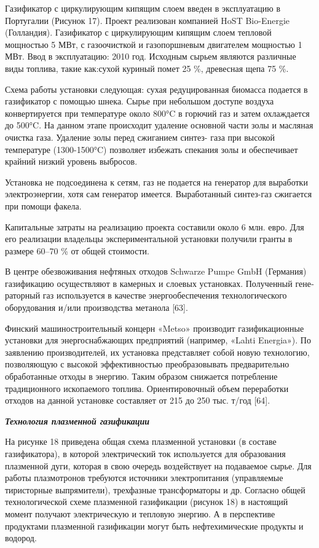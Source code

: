 \begin{multicols}{2}
Газификатор с циркулирующим кипящим слоем введен в эксплуатацию в
Португалии (Рисунок 17). Проект реализован компанией HoST Bio-Energie
(Голландия). Газификатор с циркулирующим кипящим слоем тепловой
мощностью 5 МВт, с газоочисткой и газопоршневым двигателем мощностью 1
МВт. Ввод в эксплуатацию: 2010 год. Исходным сырьем являются различные
виды топлива, такие как:сухой куриный помет 25 \%, древесная щепа 75 \%.

Схема работы установки следующая: сухая редуцированная биомасса подается
в газификатор с помощью шнека. Сырье при небольшом доступе воздуха
конвертируется при температуре около 800°C в горючий газ и затем
охлаждается до 500°C. На данном этапе происходит удаление основной части
золы и масляная очистка газа. Удаление золы перед сжиганием синтез- газа
при высокой температуре (1300-1500°C) позволяет избежать спекания золы и
обеспечивает крайний низкий уровень выбросов.

Установка не подсоединена к сетям, газ не подается на генератор для
выработки электроэнергии, хотя сам генератор имеется. Выработанный
синтез-газ сжигается при помощи факела.

Капитальные затраты на реализацию проекта составили около 6 млн. евро.
Для его реализации владельцы экспериментальной установки получили гранты
в размере 60--70 \% от общей стоимости.

В центре обезвоживания нефтяных отходов Schwarze Pumpe GmbH (Германия)
газификацию осуществляют в камерных и слоевых установках. Полученный
гене­раторный газ используется в качестве энергообеспече­ния
технологического оборудования и/или производства метанола {[}63{]}.

Финский машиностроительный концерн «Metso» про­изводит газификационные
установки для энергоснаб­жающих предприятий (например, «Lahti Energia»).
По заявлению производителей, их установка представля­ет собой новую
технологию, позволяющую с высокой эффективностью преобразовывать
предварительно обработанные отходы в энергию. Таким образом снижает­ся
потребление традиционного ископаемого топлива. Ориентировочный объем
переработки отходов на данной установке составляет от 215 до 250 тыс.
т/год {[}64{]}.

\emph{{\bfseries Технология плазменной газификации}}

На рисунке 18 приведена общая схема плазменной установки (в составе
газификатора), в которой электрический ток используется для образования
плазменной дуги, которая в свою очередь воздействует на подаваемое
сырье. Для работы плазмотронов требуются источники электропитания
(управляемые тиристорные выпрямители), трехфазные трансформаторы и др.
Согласно общей технологической схеме плазменной газификации (рисунок 18)
в настоящий момент получают электрическую и тепловую энергию. А в
перспективе продуктами плазменной газификации могут быть нефтехимические
продукты и водород.
\end{multicols}

